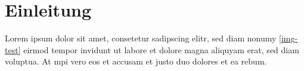 \chapter{Einleitung}\label{c1}
Lorem ipsum dolor sit amet, consetetur sadipscing elitr, sed diam nonumy \ref{img-test} eirmod tempor invidunt ut labore et dolore magna aliquyam erat, sed diam voluptua. At \gls{mpi} vero eos et accusam et justo duo dolores et ea rebum.

